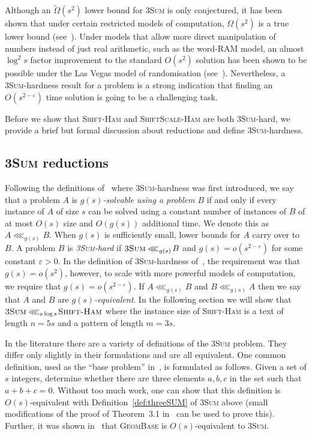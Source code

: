 \documentclass[11pt]{article}
\renewcommand{\epsilon}{\varepsilon}
\newcommand{\sHam}{\textsc{Shift-Ham}\xspace}
\newcommand{\ssHam}{\textsc{ShiftScale-Ham}\xspace}
\newcommand{\threeSUM}{\textsc{3Sum}\xspace}
\newcommand{\geombase}{\textsc{GeomBase}\xspace}
\newcommand{\freduce}[1]{\ensuremath{\lll_{#1}\!}}
\theoremstyle{plain}
\theoremstyle{definition}
\begin{document}
Although an $\tilde{\Omega}(s^2)$ lower bound for \threeSUM is only conjectured, it has been shown that under certain restricted models of computation, $\Omega(s^2)$ is a true lower bound (see~\cite{ES:1995,Erickson:1999,Erickson:convex:1999}). Under models that allow more direct manipulation of numbers instead of just real arithmetic, such as the word-RAM model, an almost $\log^2{s}$ factor improvement to the standard $O(s^2)$ solution has been shown to be possible under the Las Vegas model of randomisation (see~\cite{BDP:2005}). Nevertheless, a \threeSUM-hardness result for a problem is a strong indication that finding an $O(s^{2-\epsilon})$ time solution is going to be a challenging task.

Before we show that \sHam and \ssHam are both \threeSUM-hard, we provide a brief but formal discussion about reductions and define \threeSUM-hardness.


\subsection{\threeSUM reductions}

Following the definitions of~\cite{GO:1995} where \threeSUM-hardness was first introduced, we say that a problem $A$ is \emph{$g(s)$-solvable using a problem $B$} if and only if every instance of $A$ of size $s$ can be solved using a constant number of instances of $B$ of at most $O(s)$ size and $O(g(s))$ additional time. We denote this as $A\freduce{g(s)}B$. When $g(s)$ is sufficiently small, lower bounds for $A$ carry over to $B$. A problem $B$ is \emph{\threeSUM-hard} if $\threeSUM\freduce{g(s)} B$ and $g(s)=o(s^{2-\epsilon})$ for some constant $\epsilon>0$. In the definition of \threeSUM-hardness of~\cite{GO:1995}, the requirement was that $g(s)=o(s^2)$, however, to scale with more powerful models of computation, we require that $g(s)=o(s^{2-\epsilon})$. If $A\freduce{g(s)}B$ and $B\freduce{g(s)}A$ then we say that $A$ and $B$ are \emph{$g(s)$-equivalent}.
In the following section we will show that $\threeSUM\freduce{s\log s}\sHam$ where the instance size of \sHam is a text of length $n=5s$ and a pattern of length $m=3s$.

In the literature there are a variety of definitions of the \threeSUM problem. They differ only slightly in their formulations and are all equivalent. One common definition, used as the ``base problem'' in~\cite{GO:1995}, is formulated as follows. Given a set of $s$ integers, determine whether there are three elements $a,b,c$ in the set such that $a+b+c=0$. Without too much work, one can show that this definition is $O(s)$-equivalent with Definition~\ref{def:threeSUM} of \threeSUM above (small modifications of the proof of Theorem~3.1 in~\cite{GO:1995} can be used to prove this). Further, it was shown in~\cite{GO:1995} that \geombase is $O(s)$-equivalent to \threeSUM.
\end{document}
